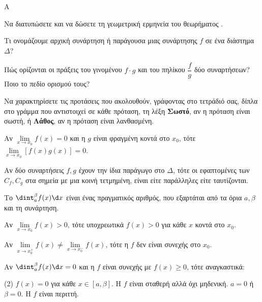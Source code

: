 \begin{thema}{A}
\begin{erwthma}
    \item Να διατυπώσετε και να δώσετε τη γεωμετρική ερμηνεία του θεωρήματος .
    \item Τι ονομάζουμε αρχική συνάρτηση ή παράγουσα μιας συνάρτησης $f$ σε ένα διάστημα $\Delta$?
    \item Πώς ορίζονται οι πράξεις του γινομένου $f\cdot g$ και του πηλίκου $\dfrac{f}{g}$ δύο συναρτήσεων? Ποιο το πεδίο ορισμού τους?
    \item Να χαρακτηρίσετε τις προτάσεις που ακολουθούν, γράφοντας στο τετράδιό σας, δίπλα στο γράμμα που αντιστοιχεί σε κάθε πρόταση, τη λέξη \textbf{Σωστό}, αν η πρόταση είναι σωστή, ή \textbf{Λάθος}, αν η πρόταση είναι λανθασμένη.
    \begin{alist}
        \item Αν $\lim\limits_{x \to x_0} f(x) = 0$ και η $g$ είναι φραγμένη κοντά στο $x_0$, τότε $\lim\limits_{x \to x_0} [f(x)g(x)] = 0$.
        \item Αν δύο συναρτήσεις $f, g$ έχουν την ίδια παράγωγο στο $\Delta$, τότε οι εφαπτομένες των $C_f, C_g$ στα σημεία με μια κοινή τετμημένη, είναι είτε παράλληλες είτε ταυτίζονται.
        \item Το $\dint_a^\beta f(x) \d x$ είναι ένας πραγματικός αριθμός, που εξαρτάται από τα όρια $a, \beta$ και τη συνάρτηση.
        \item Αν $\lim\limits_{x\to x_0} f(x) > 0$, τότε υποχρεωτικά $f(x) > 0$ για κάθε $x$ κοντά στο $x_0$.
        \item Αν $\lim\limits_{x\to x_0^+} f(x) \ne \lim\limits_{x\to x_0^-} f(x)$, τότε η $f$ δεν είναι συνεχής στο $x_0$.
    \end{alist}
    \item Αν $\dint_a^\beta f(x) \d x = 0$ και η $f$ είναι συνεχής με $f(x) \ge 0$, τότε αναγκαστικά:
    \begin{tasks}[label=\let\textdexiakeraia\relax\alph*.](2)
        \task $f(x) = 0$ για κάθε $x \in [a, \beta]$.
        \task H $f$ είναι σταθερή αλλά όχι μηδενική.
        \task $a = 0$ ή $\beta = 0$.
        \task H $f$ είναι περιττή.
    \end{tasks}
\end{erwthma}
\end{thema}


